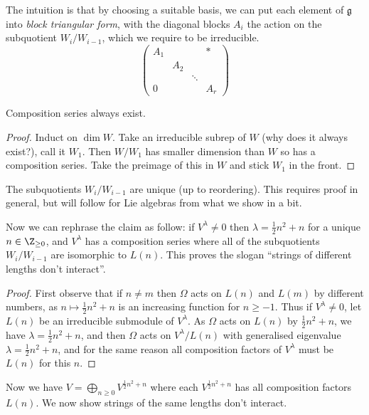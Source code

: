 \documentclass[a4paper]{article}
\newcommand*{\Lie}[1]{\mathfrak{#1}} %
\begin{document}
The intuition is that by choosing a suitable basis, we can put each element of \(\Lie g\) into \emph{block triangular form}, with the diagonal blocks \(A_i\) the action on the subquotient \(W_i/W_{i - 1}\), which we require to be irreducible.
\[
  \begin{pmatrix}
    A_1 & & & * \\
    & A_2 \\
    & & \ddots \\
    0 & & & A_r
  \end{pmatrix}
\]

\begin{lemma}
  Composition series always exist.
\end{lemma}

\begin{proof}
  Induct on \(\dim W\). Take an irreducible subrep of \(W\) (why does it always exist?), call it \(W_1\). Then \(W/W_1\) has smaller dimension than \(W\) so has a composition series. Take the preimage of this in \(W\) and stick \(W_1\) in the front.
\end{proof}

\begin{remark}
  The subquotients \(W_i/W_{i - 1}\) are unique (up to reordering). This requires proof in general, but will follow for Lie algebras from what we show in a bit.
\end{remark}

Now we can rephrase the claim as follow: if \(V^\lambda \neq 0\) then \(\lambda = \frac{1}{2} n^2 + n\) for a unique \(n \in \Z_{\geq 0}\), and \(V^\lambda\) has a composition series where all of the subquotients \(W_i/W_{i - 1}\) are isomorphic to \(L(n)\). This proves the slogan ``strings of different lengths don't interact''.

\begin{proof}
  First observe that if \(n \neq m\) then \(\Omega\) acts on \(L(n)\) and \(L(m)\) by different numbers, as \(n \mapsto \frac{1}{2} n^2 + n\) is an increasing function for \(n \geq -1\). Thus if \(V^\lambda \neq 0\), let \(L(n)\) be an irreducible submodule of \(V^\lambda\). As \(\Omega\) acts on \(L(n)\) by \(\frac{1}{2} n^2 + n\), we have \(\lambda = \frac{1}{2}n^2 + n\), and then \(\Omega\) acts on \(V^\lambda/L(n)\) with generalised eigenvalue \(\lambda = \frac{1}{2} n^2 + n\), and for the same reason all composition factors of \(V^\lambda\) must be \(L(n)\) for this \(n\).
\end{proof}

Now we have \(V = \bigoplus_{n \geq 0} V^{\frac{1}{2}n^2 + n}\) where each \(V^{\frac{1}{2}n^2 + n}\) has all composition factors \(L(n)\). We now show strings of the same lengths don't interact.
\end{document}
